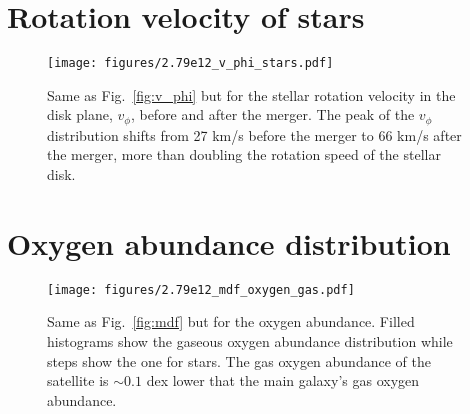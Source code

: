 \documentclass[useAMS,usenatbib]{mnras}
\begin{document}


\appendix

\section{Rotation velocity of stars}

\begin{figure}
    \begin{centering}
        \texttt{[image: figures/2.79e12\_v\_phi\_stars.pdf]}
        \caption{
            Same as Fig.~\ref{fig:v_phi} but for the stellar rotation velocity in the disk plane, $v_\phi$, before and after the merger. The peak of the $v_\phi$ distribution shifts from 27 km/s before the merger to 66 km/s after the merger, more than doubling the rotation speed of the stellar disk.
        }
        \label{fig:v_phi_stars}
    \end{centering}
\end{figure}

\section{Oxygen abundance distribution}

\begin{figure*}
    \begin{centering}
        \texttt{[image: figures/2.79e12\_mdf\_oxygen\_gas.pdf]}
        \caption{
            Same as Fig.~\ref{fig:mdf} but for the oxygen abundance. Filled histograms show the gaseous oxygen abundance distribution while steps show the one for stars. The gas oxygen abundance of the satellite is  $\sim0.1$ dex lower that the main galaxy's gas oxygen abundance.
        }
        \label{fig:mdf_oxygen}
    \end{centering}
\end{figure*}

\label{lastpage}
\end{document}
